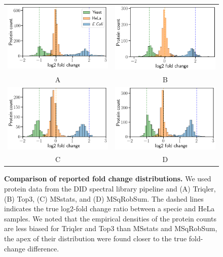 \documentclass[10pt,letterpaper]{article}
\begin{document}
\begin{figure}[hbt]
    \centering
    \begin{tabular}{cc}
	    \includegraphics[width=0.4\linewidth]{../../result/report_plots_filtered/osw_triqler_intensity.png} & 
	    \includegraphics[width=0.4\linewidth]{../../result/report_plots_filtered/osw_top3_intensity.png} \\ 
        A & B \\ 
	    \includegraphics[width=0.4\linewidth]{../../result/report_plots_filtered/osw_msstats_intensity.png} & 
	    \includegraphics[width=0.4\linewidth]{../../result/report_plots_filtered/osw_msqrobsum_intensity.png} \\
        C & D 
    \end{tabular}
    \caption{{\bf Comparison of reported fold change distributions.} We used protein data from the DID spectral library pipeline and (A) Triqler, (B) Top3, (C) MSstats, and (D) MSqRobSum. The dashed lines indicates the true log2-fold change ratio between a specie and HeLa samples. We noted that the empirical densities of the protein counts are less biased for Triqler and Top3 than MSstats and MSqRobSum, the apex of their distribution were found closer to the true fold-change difference. \label{fig:fc_histogram}} %
\end{figure}
\end{document}
